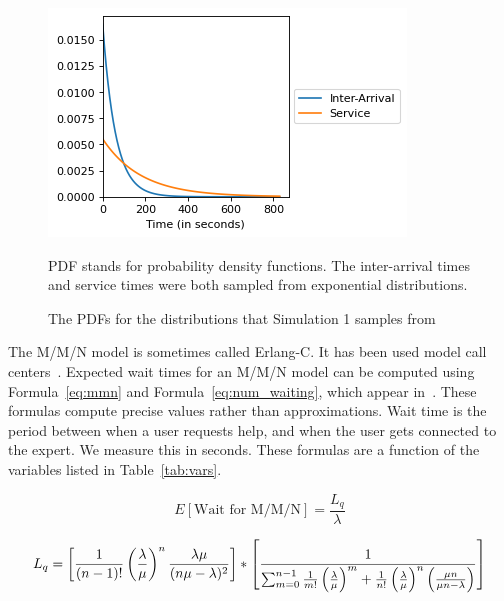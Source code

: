 \begin{figure}[h]
  \includegraphics{figures/montecarlo/expon_expon.png}
  \begin{captiontext}
    PDF stands for probability density functions.
    The inter-arrival times and service times were both sampled from
    exponential distributions.
  \end{captiontext}
  \caption{
    The PDFs for the distributions that Simulation 1 samples from
  }\label{fig:simple_sim1_dists}
\end{figure}

The M/M/N model is sometimes called Erlang-C.
It has been used model call centers~\cite{queue1}.
Expected wait times for an M/M/N model can be computed using
Formula~\ref{eq:mmn} and Formula~\ref{eq:num_waiting}, which appear
in~\cite{mmn_formula}.
These formulas compute precise values rather than approximations.
Wait time is the period between when a user requests help, and when the user
gets connected to the expert.
We measure this in seconds.
These formulas are a function of the variables listed in Table~\ref{tab:vars}.

\begin{equation}
  E[\text{Wait for M/M/N}] = \frac{L_q}{\lambda}
  \label{eq:mmn}
\end{equation}

\begin{equation}
  L_q = \left[ \frac{1}{(n - 1)!} \left( \frac{\lambda}{\mu} \right)^n
    \frac{\lambda \mu}{(n \mu - \lambda)^2} \right] *
  \left[ \frac{1}{\sum_{m=0}^{n-1} \frac{1}{m!} \left( \frac{\lambda}{\mu}
      \right)^m + \frac{1}{n!} \left( \frac{\lambda}{\mu} \right)^n
    \left( \frac{\mu n}{\mu n - \lambda} \right) } \right]
\label{eq:num_waiting}
\vspace{0.4in}
\end{equation}

